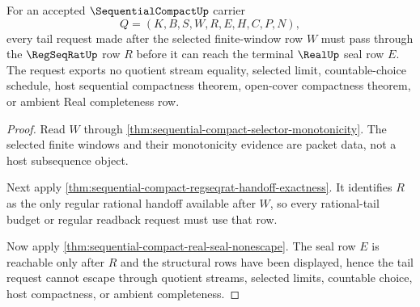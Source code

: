 \begin{theorem}
\label{thm:sequential-compact-regular-tail-nonescape}
For an accepted $\SequentialCompactUp$ carrier
$$
Q=(K,B,S,W,R,E,H,C,P,N),
$$
every tail request made after the selected finite-window row $W$ must pass through the $\RegSeqRatUp$ row $R$ before it can reach the terminal $\RealUp$ seal row $E$. The request exports no quotient stream equality, selected limit, countable-choice schedule, host sequential compactness theorem, open-cover compactness theorem, or ambient Real completeness row.
\end{theorem}
\begin{proof}
Read $W$ through \autoref{thm:sequential-compact-selector-monotonicity}. The selected finite windows and their monotonicity evidence are packet data, not a host subsequence object.

Next apply \autoref{thm:sequential-compact-regseqrat-handoff-exactness}. It identifies $R$ as the only regular rational handoff available after $W$, so every rational-tail budget or regular readback request must use that row.

Now apply \autoref{thm:sequential-compact-real-seal-nonescape}. The seal row $E$ is reachable only after $R$ and the structural rows have been displayed, hence the tail request cannot escape through quotient streams, selected limits, countable choice, host compactness, or ambient completeness.
\end{proof}

